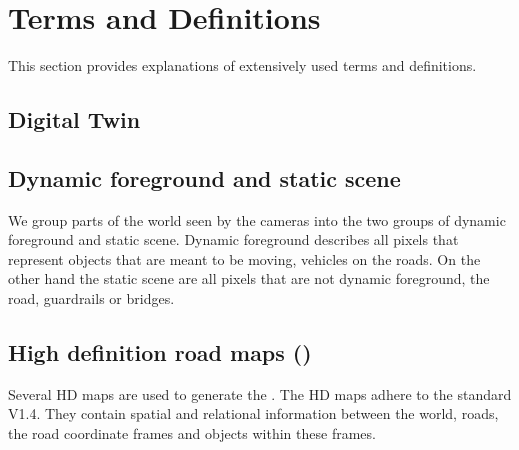 
\section{Terms and Definitions}
This section provides explanations of extensively used terms and definitions. 

\subsection{Digital Twin}
\label{sec:digital_twin}

\subsection{Dynamic foreground and static scene}
\label{sec:dynamic_foreground_static_scene}
We group parts of the world seen by the cameras into the two groups of dynamic foreground and static scene.
Dynamic foreground describes all pixels that represent objects that are meant to be moving, \eg{} vehicles on the roads.
On the other hand the static scene are all pixels that are not dynamic foreground, \eg{} the road, guardrails or bridges.



\subsection{High definition road maps (\HDmaps{})}
\label{sec:hd_maps}
Several HD maps are used to generate the \DigitalTwin{}.
The HD maps adhere to the \OD{} standard V1.4. 
They contain spatial and relational information between the world, roads, the road coordinate frames and objects within these frames.
